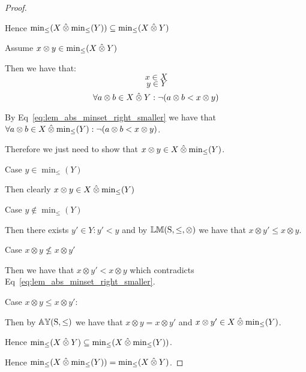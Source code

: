 \documentclass[../Summary.tex]{subfiles}
\begin{document}
\begin{proof}
\begin{ind}
\end{ind}
Hence $ \min_\leq(X \mathbin{\hat{\otimes}} \min_\leq(Y)) \subseteq \min_\leq(X \mathbin{\hat{\otimes}} Y)$

\vspace{2em}

Assume $x \otimes y \in \min_\leq(X \mathbin{\hat{\otimes}} Y)$
\begin{ind}
Then we have that:
\begin{equation}
x \in X
\end{equation}
\begin{equation}
y \in Y
\end{equation}
\begin{equation} \label{eq:lem_abs_minset_right_smaller}
\forall a \otimes b \in X \mathbin{\hat{\otimes}} Y : \neg (a \otimes b < x \otimes y)
\end{equation}

By Eq~\ref{eq:lem_abs_minset_right_smaller} we have that $\forall a \otimes b \in X \mathbin{\hat{\otimes}} \min_\leq(Y) : \neg (a \otimes b < x \otimes y)$.

\vspace{0.5em}

Therefore we just need to show that $x \otimes y \in X \mathbin{\hat{\otimes}} \min_\leq(Y)$.

\vspace{0.5em}

Case $y \in \min_\leq(Y)$
\begin{ind}
Then clearly $x \otimes y \in X \mathbin{\hat{\otimes}} \min_\leq(Y)$
\end{ind}

Case $y \notin \min_\leq(Y)$
\begin{ind}
Then there exists $y' \in Y : y' < y$ and by ${\mathbb{LM}}\mathrm{(S,\leq,\otimes)}$ we have that $x \otimes y' \leq x \otimes y$.

\vspace{0.5em}

Case $x \otimes y \nleq x \otimes y'$
\begin{ind}
Then we have that $x \otimes y' < x \otimes y$ which contradicts Eq~\ref{eq:lem_abs_minset_right_smaller}.
\end{ind}
Case $x \otimes y \leq x \otimes y'$:
\begin{ind}
Then by ${\mathbb{AY}}\mathrm{(S,\leq)}$ we have that $x \otimes y = x \otimes y'$ and $x \otimes y' \in X \mathbin{\hat{\otimes}} \min_\leq(Y)$.
\end{ind}
\end{ind}
\end{ind}
Hence $\min_\leq(X \mathbin{\hat{\otimes}} Y) \subseteq \min_\leq(X \mathbin{\hat{\otimes}} \min_\leq(Y))$.

\vspace{2em}

Hence $\min_\leq(X \mathbin{\hat{\otimes}} \min_\leq(Y)) = \min_\leq(X \mathbin{\hat{\otimes}} Y)$.
\end{proof}
\end{document}
